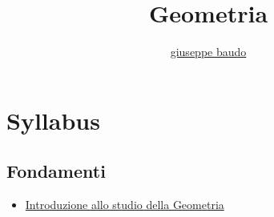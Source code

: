 \documentclass[a4paper,10pt]{article}
\title{Geometria}
\author{\href{http://www.baudo.hol.es}{giuseppe baudo}}
\begin{document}
\maketitle

\section*{Syllabus}

\subsection*{Fondamenti}
  \begin{itemize}
   \item \href{IntroduzioneGeometria.pdf}{Introduzione allo studio della Geometria}
  \end{itemize}  
\end{document}
